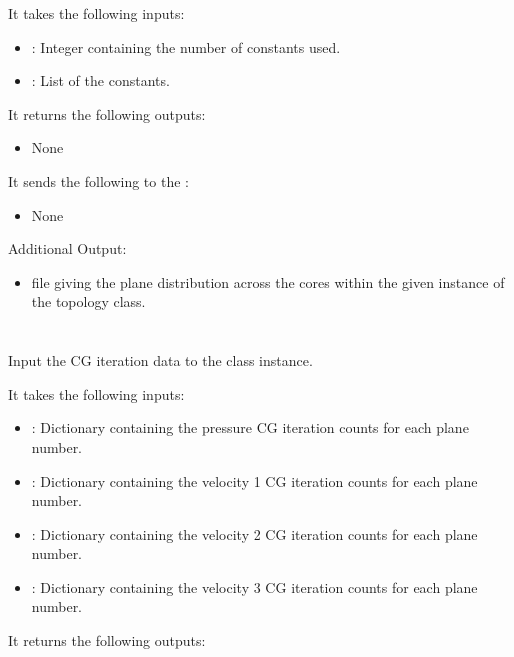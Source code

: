 It takes the following inputs:

\begin{itemize}
\item {}:  Integer containing the number of constants used.
\item {}: List of the constants.
\end{itemize}

It returns the following outputs:

\begin{itemize}
\item None
\end{itemize}

It sends the following to the :

\begin{itemize}
\item None
\end{itemize}

Additional Output:
\begin{itemize}
\item {} file giving the plane distribution across the cores within the given instance of the topology class. 
\end{itemize}


\section{}
Input the CG iteration data to the class instance.

It takes the following inputs:

\begin{itemize}
\item {}: Dictionary containing the pressure CG iteration counts for each plane number.
\item {}: Dictionary containing the velocity 1 CG iteration counts for each plane number.
\item {}: Dictionary containing the velocity 2 CG iteration counts for each plane number.
\item {}: Dictionary containing the velocity 3 CG iteration counts for each plane number.
\end{itemize}

It returns the following outputs:


